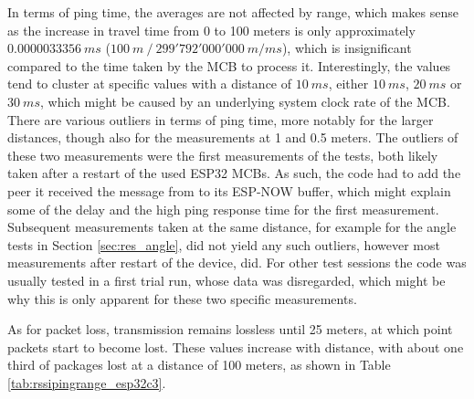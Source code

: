 In terms of ping time, the averages are not affected by range, which makes sense as the increase in travel time from 0 to 100 meters is only approximately $0.0000033356\ ms$ ($100\ m\ /\ 299'792'000'000\ m/ms$), which is insignificant compared to the time taken by the MCB to process it. Interestingly, the values tend to cluster at specific values with a distance of $10\ ms$, either $10\ ms$, $20\ ms$ or $30\ ms$, which might be caused by an underlying system clock rate of the MCB. There are various outliers in terms of ping time, more notably for the larger distances, though also for the measurements at 1 and 0.5 meters. The outliers of these two measurements were the first measurements of the tests, both likely taken after a restart of the used ESP32 MCBs. As such, the code had to add the peer it received the message from to its ESP-NOW buffer, which might explain some of the delay and the high ping response time for the first measurement. Subsequent measurements taken at the same distance, for example for the angle tests in Section \ref{sec:res_angle}, did not yield any such outliers, however most measurements after restart of the device, did. For other test sessions the code was usually tested in a first trial run, whose data was disregarded, which might be why this is only apparent for these two specific measurements.

As for packet loss, transmission remains lossless until 25 meters, at which point packets start to become lost. These values increase with distance, with about one third of packages lost at a distance of 100 meters, as shown in Table \ref{tab:rssipingrange_esp32c3}.

